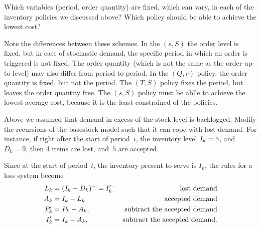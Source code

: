 \documentclass[stochastic-or.tex]{subfiles}
\begin{document}
\begin{exercise}
  Which variables (period, order quantity) are fixed, which can  vary, in each of the inventory policies  we discussed above? Which policy should be able to achieve the lowest cost?
  \begin{solution}
  Note the differences between these schemes.
In the $(s,S)$ the order level is fixed, but in case of stochastic demand, the specific period in which an order is triggered is not fixed.
The order quantity (which is not the same as the order-up-to level) may also differ from period to period.
In the $(Q,r)$ policy, the order quantity is fixed, but not the period.
The $(T,S)$ policy fixes the period, but leaves the order quantity free.
The $(s,S)$ policy must be ablle to achieve the lowest average cost, because it is the least constrained of the policies.
  \end{solution}
\end{exercise}



\begin{exercise}
Above we assumed that demand in excess of the  stock level is backlogged.
Modify the recursions of the basestock model such that it can cope with lost demand.
For instance, if right after the start of period~$i$, the inventory level $I_{k}= 5$, and $D_k=9$, then 4 items are lost, and~$5$ are accepted.
\begin{solution}
Since at the start of period~$t$, the inventory present to serve is $I_{k}$, the rules for a loss system become
\begin{align*}
L_k &= (I_k-D_k)^- = I_k'^- & \text{lost demand}\\
A_k &= I_{k} - L_k & \text{accepted demand}\\
P_k' &= P_{k} - A_k, &\text{subtract the accepted demand}\\
I_k' &= I_{k} - A_k, &\text{subtract the accepted demand}.
\end{align*}
\end{solution}
\end{exercise}





\end{document}
